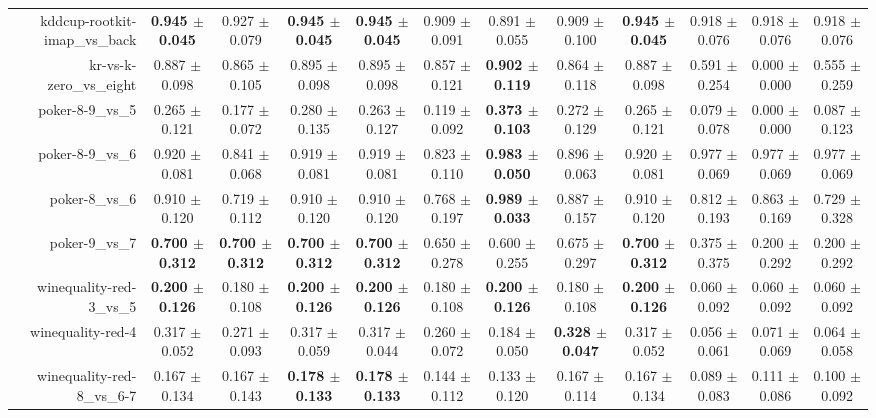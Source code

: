 \begin{table}[!ht]
{\begin{tabular}{r c c c c c c c c c c c}
kddcup-rootkit-imap\_vs\_back & \textbf{0.945 $\pm$ 0.045} & 0.927 $\pm$ 0.079 & \textbf{0.945 $\pm$ 0.045} & \textbf{0.945 $\pm$ 0.045} & 0.909 $\pm$ 0.091 & 0.891 $\pm$ 0.055 & 0.909 $\pm$ 0.100 & \textbf{0.945 $\pm$ 0.045} & 0.918 $\pm$ 0.076 & 0.918 $\pm$ 0.076 & 0.918 $\pm$ 0.076 \\
kr-vs-k-zero\_vs\_eight & 0.887 $\pm$ 0.098 & 0.865 $\pm$ 0.105 & 0.895 $\pm$ 0.098 & 0.895 $\pm$ 0.098 & 0.857 $\pm$ 0.121 & \textbf{0.902 $\pm$ 0.119} & 0.864 $\pm$ 0.118 & 0.887 $\pm$ 0.098 & 0.591 $\pm$ 0.254 & 0.000 $\pm$ 0.000 & 0.555 $\pm$ 0.259 \\
poker-8-9\_vs\_5 & 0.265 $\pm$ 0.121 & 0.177 $\pm$ 0.072 & 0.280 $\pm$ 0.135 & 0.263 $\pm$ 0.127 & 0.119 $\pm$ 0.092 & \textbf{0.373 $\pm$ 0.103} & 0.272 $\pm$ 0.129 & 0.265 $\pm$ 0.121 & 0.079 $\pm$ 0.078 & 0.000 $\pm$ 0.000 & 0.087 $\pm$ 0.123 \\
poker-8-9\_vs\_6 & 0.920 $\pm$ 0.081 & 0.841 $\pm$ 0.068 & 0.919 $\pm$ 0.081 & 0.919 $\pm$ 0.081 & 0.823 $\pm$ 0.110 & \textbf{0.983 $\pm$ 0.050} & 0.896 $\pm$ 0.063 & 0.920 $\pm$ 0.081 & 0.977 $\pm$ 0.069 & 0.977 $\pm$ 0.069 & 0.977 $\pm$ 0.069 \\
poker-8\_vs\_6 & 0.910 $\pm$ 0.120 & 0.719 $\pm$ 0.112 & 0.910 $\pm$ 0.120 & 0.910 $\pm$ 0.120 & 0.768 $\pm$ 0.197 & \textbf{0.989 $\pm$ 0.033} & 0.887 $\pm$ 0.157 & 0.910 $\pm$ 0.120 & 0.812 $\pm$ 0.193 & 0.863 $\pm$ 0.169 & 0.729 $\pm$ 0.328 \\
poker-9\_vs\_7 & \textbf{0.700 $\pm$ 0.312} & \textbf{0.700 $\pm$ 0.312} & \textbf{0.700 $\pm$ 0.312} & \textbf{0.700 $\pm$ 0.312} & 0.650 $\pm$ 0.278 & 0.600 $\pm$ 0.255 & 0.675 $\pm$ 0.297 & \textbf{0.700 $\pm$ 0.312} & 0.375 $\pm$ 0.375 & 0.200 $\pm$ 0.292 & 0.200 $\pm$ 0.292 \\
winequality-red-3\_vs\_5 & \textbf{0.200 $\pm$ 0.126} & 0.180 $\pm$ 0.108 & \textbf{0.200 $\pm$ 0.126} & \textbf{0.200 $\pm$ 0.126} & 0.180 $\pm$ 0.108 & \textbf{0.200 $\pm$ 0.126} & 0.180 $\pm$ 0.108 & \textbf{0.200 $\pm$ 0.126} & 0.060 $\pm$ 0.092 & 0.060 $\pm$ 0.092 & 0.060 $\pm$ 0.092 \\
winequality-red-4 & 0.317 $\pm$ 0.052 & 0.271 $\pm$ 0.093 & 0.317 $\pm$ 0.059 & 0.317 $\pm$ 0.044 & 0.260 $\pm$ 0.072 & 0.184 $\pm$ 0.050 & \textbf{0.328 $\pm$ 0.047} & 0.317 $\pm$ 0.052 & 0.056 $\pm$ 0.061 & 0.071 $\pm$ 0.069 & 0.064 $\pm$ 0.058 \\
winequality-red-8\_vs\_6-7 & 0.167 $\pm$ 0.134 & 0.167 $\pm$ 0.143 & \textbf{0.178 $\pm$ 0.133} & \textbf{0.178 $\pm$ 0.133} & 0.144 $\pm$ 0.112 & 0.133 $\pm$ 0.120 & 0.167 $\pm$ 0.114 & 0.167 $\pm$ 0.134 & 0.089 $\pm$ 0.083 & 0.111 $\pm$ 0.086 & 0.100 $\pm$ 0.092 \\

\end{tabular}}
\end{table}
